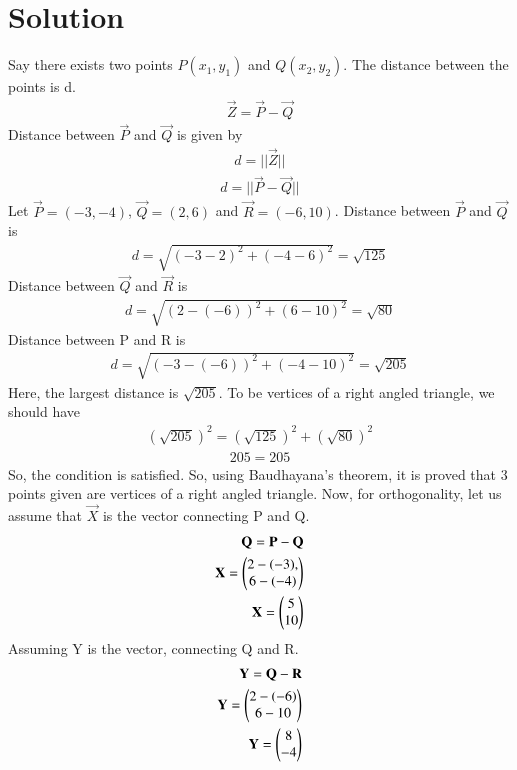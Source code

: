 \documentclass[journal,12pt,twocolumn]{IEEEtran}
\begin{document}
\section{Solution}
Say there exists two points $P(x_1, y_1)$ and $Q(x_2, y_2)$. The distance between the points is d. 
\begin{align}
    \vec{Z} = \vec{P} -\vec{ Q}
\end{align}
Distance between $\vec{P}$ and $\vec{ Q}$ is given by 
\begin{align}
d = ||\vec{Z}||
\end{align}
\begin{align}
d = ||\vec{P} -\vec{ Q}||
\end{align}
Let $\vec{P}= (-3, -4)$, $\vec{ Q} = (2, 6)$ and $\vec{R} = (-6, 10)$.
Distance between $\vec{P}$ and $\vec{Q}$ is 
\begin{align}
d = \sqrt{(-3-2)^2+(-4-6)^2}
=\sqrt{125}
\end{align}
Distance between $\vec{Q}$ and $\vec{R}$ is 
\begin{align}
d = \sqrt{(2-(-6))^2+(6-10)^2}
=\sqrt{80}
\end{align}
Distance between P and R is 
\begin{align}
d = \sqrt{(-3-(-6))^2+(-4-10)^2}
=\sqrt{205}
\end{align}
Here, the largest distance is $\sqrt{205}$. To be vertices of a right angled triangle, we should have 
\begin{align}
  (\sqrt{205})^2 = (\sqrt{125})^2 + (\sqrt{80})^2
\end{align}
\begin{align}
  205 = 205
\end{align}
So, the condition is satisfied. 
So, using Baudhayana's theorem, it is proved that 3 points given are vertices of a right angled triangle. 
Now, for orthogonality, let us assume that $\vec{X}$ is the vector connecting P and Q.
\begin{align}
\mathbf{Q} = \mathbf{P}-\mathbf{Q}
\\ \mathbf{X}=\begin{pmatrix}2-(-3),\\ 6-(-4)\end{pmatrix}
 \\\mathbf{X}= \begin{pmatrix}5\\10\end{pmatrix}
\end{align}
Assuming Y is the vector, connecting Q and R. 
\begin{align}
\mathbf{Y} =\mathbf{Q}-\mathbf{R}
\\
         \mathbf{Y}=\begin{pmatrix}2-(-6)\\ 6-10\end{pmatrix}
 \\
 \mathbf{Y}= \begin{pmatrix}8\\-4 \end{pmatrix}
\end{align}
\end{document}

